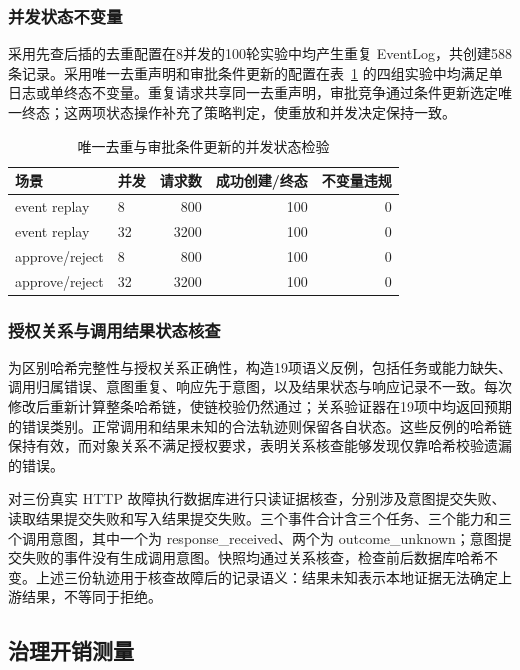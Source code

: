 \subsubsection{并发状态不变量}

采用先查后插的去重配置在8并发的100轮实验中均产生重复 EventLog，共创建588条记录。采用唯一去重声明和审批条件更新的配置在表~\ref{tab:concurrency-v11} 的四组实验中均满足单日志或单终态不变量。重复请求共享同一去重声明，审批竞争通过条件更新选定唯一终态；这两项状态操作补充了策略判定，使重放和并发决定保持一致。

\begin{table}[htbp]
\centering
\caption{唯一去重与审批条件更新的并发状态检验}
\label{tab:concurrency-v11}
\small
\begin{tabular}{llrrr}
\toprule
场景 & 并发 & 请求数 & 成功创建/终态 & 不变量违规 \\
\midrule
event replay & 8 & 800 & 100 & 0 \\
event replay & 32 & 3200 & 100 & 0 \\
approve/reject & 8 & 800 & 100 & 0 \\
approve/reject & 32 & 3200 & 100 & 0 \\
\bottomrule
\end{tabular}
\end{table}

\subsubsection{授权关系与调用结果状态核查}
\label{sec:evidence-rr022}

为区别哈希完整性与授权关系正确性，构造19项语义反例，包括任务或能力缺失、调用归属错误、意图重复、响应先于意图，以及结果状态与响应记录不一致。每次修改后重新计算整条哈希链，使链校验仍然通过；关系验证器在19项中均返回预期的错误类别。正常调用和结果未知的合法轨迹则保留各自状态。这些反例的哈希链保持有效，而对象关系不满足授权要求，表明关系核查能够发现仅靠哈希校验遗漏的错误。

对三份真实 HTTP 故障执行数据库进行只读证据核查，分别涉及意图提交失败、读取结果提交失败和写入结果提交失败。三个事件合计含三个任务、三个能力和三个调用意图，其中一个为 response\_received、两个为 outcome\_unknown；意图提交失败的事件没有生成调用意图。快照均通过关系核查，检查前后数据库哈希不变。上述三份轨迹用于核查故障后的记录语义：结果未知表示本地证据无法确定上游结果，不等同于拒绝。

\subsection{治理开销测量}
\label{sec:engineering-rr022}

